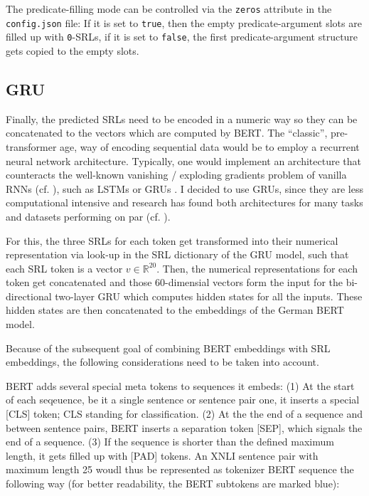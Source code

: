 \begin{tcolorbox}[
  colback=blue!5!white,
  colframe=blue!75!black,
  title={\centering Code}]

  The predicate-filling mode can be controlled via the \texttt{zeros} attribute in
  the \texttt{config.json} file: If it is set to \texttt{true}, then the empty
  predicate-argument slots are filled up with \texttt{0}-SRLs, if it is
  set to \texttt{false}, the first predicate-argument structure gets copied
  to the empty slots.

\end{tcolorbox}



\subsection{GRU}

Finally, the predicted SRLs need to be encoded in a numeric way so they can be concatenated to
the vectors which are computed by BERT. The ``classic'', pre-transformer age, way of encoding
sequential data would be to employ a recurrent neural network architecture. Typically, one would
implement an architecture that counteracts the well-known vanishing / exploding gradients problem
of vanilla RNNs (cf. \citep{bengio1994learning}), such as LSTMs \citep{hochreiter1997long} or
GRUs \citep{cho2014learning}. I decided to use GRUs, since they are less computational intensive
and research has found both architectures for many tasks and datasets performing on par (cf.
\cite{chung2014empirical}).

For this, the three SRLs for each token get transformed into their numerical representation
via look-up in the SRL dictionary of the GRU model, such that each SRL token is a vector $v
\in \mathbb{R}^{20}$. Then, the numerical representations for each token get concatenated and
those 60-dimensial vectors form the input for the bi-directional two-layer GRU which computes
hidden states for all the inputs. These hidden states are then concatenated to the embeddings
of the German BERT model.

Because of the subsequent goal of combining BERT embeddings with SRL embeddings, the following
considerations need to be taken into account.


BERT adds several special meta tokens to sequences it embeds: (1) At the start of each
seqeuence, be it a single sentence or sentence pair one, it inserts a special [CLS] token; CLS
standing for classification. (2) At the the end of a sequence and between sentence pairs, BERT
inserts a separation token [SEP], which signals the end of a sequence. (3) If the sequence
is shorter than the defined maximum length, it gets filled up with [PAD] tokens. An XNLI sentence
pair with maximum length 25 woudl thus be represented as tokenizer BERT sequence the following
way (for better readability, the BERT subtokens are marked blue):

